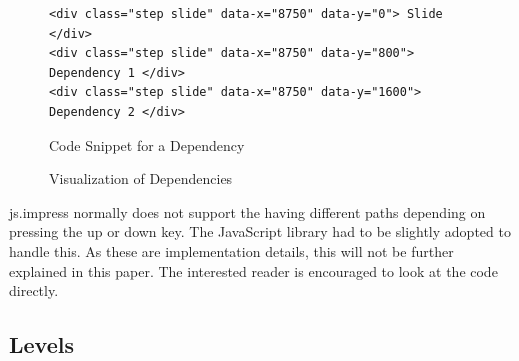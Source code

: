 \documentclass[twoside, 12pt]{article}
\begin{document}
\begin{figure}
\vspace{-26pt}
\begin{verbatim}
<div class="step slide" data-x="8750" data-y="0"> Slide </div>
<div class="step slide" data-x="8750" data-y="800"> Dependency 1 </div>
<div class="step slide" data-x="8750" data-y="1600"> Dependency 2 </div>
\end{verbatim}
\vspace{-5pt}
  \caption{Code Snippet for a Dependency}
  \label{fig:dependencySnippet}
  \vspace{12pt}
\end{figure}

\begin{figure}
\vspace{-26pt}
  \begin{center}
\vspace{-5pt}
  \caption{Visualization of Dependencies}
  \label{fig:visualDependency}
\vspace{-24pt}
  \end{center}
\end{figure}

\begin{figure}
\vspace{-50pt}
\end{figure}

js.impress normally does not support the having different paths depending on pressing the up or down key. The JavaScript library had to be slightly adopted to handle this. As these are implementation details, this will not be further explained in this paper. The interested reader is encouraged to look at the code \cite{npentrel:npentrel15} directly.\\

\newpage
\subsection{Levels}
\label{sec:levels}
\end{document}
